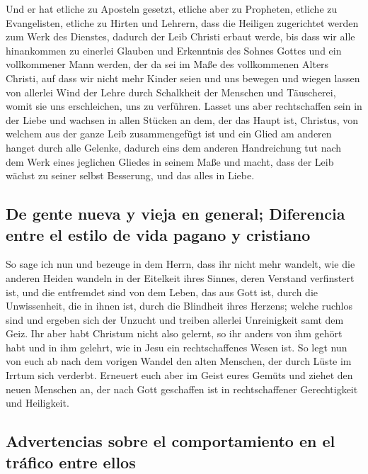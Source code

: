  Und er hat etliche zu Aposteln gesetzt, etliche aber zu
Propheten, etliche zu Evangelisten, etliche zu Hirten und Lehrern,
 dass die Heiligen zugerichtet werden zum Werk des
Dienstes, dadurch der Leib Christi erbaut werde,  bis
dass wir alle hinankommen zu einerlei Glauben und Erkenntnis des Sohnes
Gottes und ein vollkommener Mann werden, der da sei im Maße des
vollkommenen Alters Christi,  auf dass wir nicht mehr
Kinder seien und uns bewegen und wiegen lassen von allerlei Wind der
Lehre durch Schalkheit der Menschen und Täuscherei, womit sie uns
erschleichen, uns zu verführen.  Lasset uns aber
rechtschaffen sein in der Liebe und wachsen in allen Stücken an dem, der
das Haupt ist, Christus,  von welchem aus der ganze Leib
zusammengefügt ist und ein Glied am anderen hanget durch alle Gelenke,
dadurch eins dem anderen Handreichung tut nach dem Werk eines jeglichen
Gliedes in seinem Maße und macht, dass der Leib wächst zu seiner selbst
Besserung, und das alles in Liebe.

\hypertarget{de-gente-nueva-y-vieja-en-general-diferencia-entre-el-estilo-de-vida-pagano-y-cristiano}{%
\subsection{De gente nueva y vieja en general; Diferencia entre el
estilo de vida pagano y
cristiano}\label{de-gente-nueva-y-vieja-en-general-diferencia-entre-el-estilo-de-vida-pagano-y-cristiano}}

 So sage ich nun und bezeuge in dem Herrn, dass ihr nicht
mehr wandelt, wie die anderen Heiden wandeln in der Eitelkeit ihres
Sinnes,  deren Verstand verfinstert ist, und die
entfremdet sind von dem Leben, das aus Gott ist, durch die Unwissenheit,
die in ihnen ist, durch die Blindheit ihres Herzens; 
welche ruchlos sind und ergeben sich der Unzucht und treiben allerlei
Unreinigkeit samt dem Geiz.  Ihr aber habt Christum nicht
also gelernt,  so ihr anders von ihm gehört habt und in
ihm gelehrt, wie in Jesu ein rechtschaffenes Wesen ist. 
So legt nun von euch ab nach dem vorigen Wandel den alten Menschen, der
durch Lüste im Irrtum sich verderbt.  Erneuert euch aber
im Geist eures Gemüts  und ziehet den neuen Menschen an,
der nach Gott geschaffen ist in rechtschaffener Gerechtigkeit und
Heiligkeit.

\hypertarget{advertencias-sobre-el-comportamiento-en-el-truxe1fico-entre-ellos}{%
\subsection{Advertencias sobre el comportamiento en el tráfico entre
ellos}\label{advertencias-sobre-el-comportamiento-en-el-truxe1fico-entre-ellos}}

